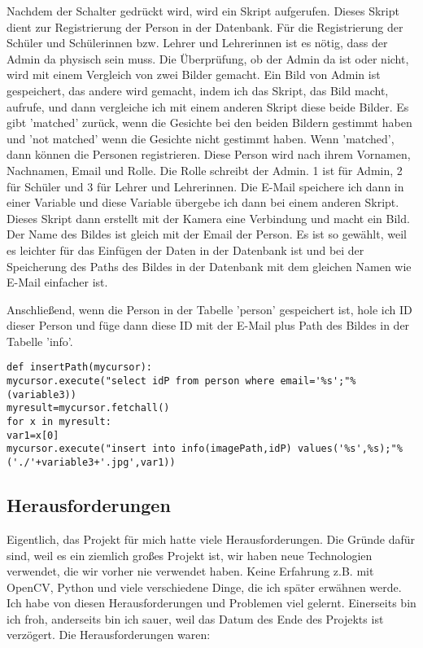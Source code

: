 \begin{enumerate}
Nachdem der Schalter gedrückt wird, wird ein Skript aufgerufen. Dieses Skript dient zur Registrierung der Person in der Datenbank.
Für die Registrierung der Schüler und Schülerinnen bzw. Lehrer und Lehrerinnen ist es nötig, dass der Admin da physisch sein muss. Die Überprüfung, ob der Admin da ist oder nicht,  wird mit einem Vergleich von zwei Bilder gemacht. Ein Bild von Admin ist gespeichert, das andere wird gemacht, indem ich das Skript, das Bild macht, aufrufe, und dann vergleiche ich mit einem anderen Skript diese beide Bilder. Es gibt 'matched' zurück, wenn die Gesichte bei den beiden Bildern gestimmt haben und 'not matched' wenn die Gesichte nicht gestimmt haben.
Wenn 'matched', dann können die Personen registrieren.
 Diese Person wird nach ihrem Vornamen, Nachnamen, Email und Rolle. Die Rolle schreibt der Admin. 1 ist für Admin, 2 für Schüler und 3 für Lehrer und Lehrerinnen. Die E-Mail speichere ich dann in einer Variable und diese Variable übergebe ich dann bei einem anderen Skript. Dieses Skript dann erstellt mit der Kamera eine Verbindung und macht ein Bild. Der Name des Bildes ist gleich mit der Email der Person. Es ist so gewählt, weil es leichter für das Einfügen der Daten in der Datenbank ist  und bei der Speicherung des Paths des Bildes in der Datenbank mit dem gleichen Namen wie E-Mail einfacher ist.

Anschließend, wenn die Person in der Tabelle 'person' gespeichert ist, hole ich ID dieser Person und füge dann diese ID mit der E-Mail plus Path des Bildes in der Tabelle 'info'. 


\begin{lstlisting}
def insertPath(mycursor):
mycursor.execute("select idP from person where email='%s';"%(variable3))
myresult=mycursor.fetchall()
for x in myresult:
var1=x[0]
mycursor.execute("insert into info(imagePath,idP) values('%s',%s);"%('./'+variable3+'.jpg',var1))

\end{lstlisting}


\end{enumerate}
\subsection{Herausforderungen}
Eigentlich, das Projekt für mich hatte viele Herausforderungen. Die Gründe dafür sind, weil es ein ziemlich großes Projekt ist, wir haben neue Technologien verwendet, die wir vorher nie verwendet haben. Keine Erfahrung z.B. mit OpenCV, Python und viele verschiedene Dinge, die ich später erwähnen werde. Ich habe von diesen Herausforderungen und Problemen viel gelernt. Einerseits bin ich froh, anderseits bin ich sauer, weil das Datum des Ende des Projekts ist verzögert. 
Die Herausforderungen waren:

